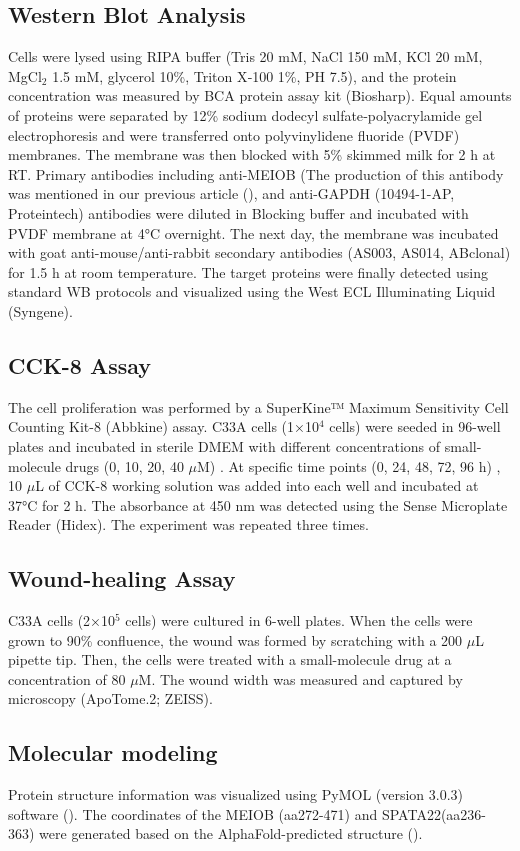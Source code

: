 \documentclass[unnumsec,webpdf,contemporary,large]{oup-authoring-template}%
\theoremstyle{thmstyleone}%
\theoremstyle{thmstyletwo}%
\theoremstyle{thmstylethree}%
\begin{document}
\subsection*{Western Blot Analysis}
Cells were lysed using RIPA buffer (Tris 20 mM, NaCl 150 mM, KCl 20 mM, MgCl$_2$ 1.5 mM, glycerol 10\%, Triton X‐100 1\%, PH 7.5), and the protein concentration was measured by BCA protein assay kit (Biosharp). Equal amounts of proteins were separated by 12\% sodium dodecyl sulfate‐polyacrylamide gel electrophoresis and were transferred onto polyvinylidene fluoride (PVDF) membranes. The membrane was then blocked with 5\% skimmed milk for 2 h at RT. Primary antibodies including anti-MEIOB (The production of this antibody was mentioned in our previous article (\citealt{6}), and anti-GAPDH (10494-1-AP, Proteintech) antibodies were diluted in Blocking buffer and incubated with PVDF membrane at 4°C overnight. The next day, the membrane was incubated with goat anti-mouse/anti-rabbit secondary antibodies (AS003, AS014, ABclonal) for 1.5 h at room temperature. The target proteins were finally detected using standard WB protocols and visualized using the West ECL Illuminating Liquid (Syngene). 

\subsection*{CCK-8 Assay}
The cell proliferation was performed by a SuperKine™ Maximum Sensitivity Cell Counting Kit-8 (Abbkine) assay. C33A cells (1×10$^{4}$ cells) were seeded in 96-well plates and incubated in sterile DMEM with different concentrations of small-molecule drugs (0, 10, 20, 40 $\mu$M) . At specific time points (0, 24, 48, 72, 96 h) , 10 $\mu$L of CCK-8 working solution was added into each well and incubated at 37°C for 2 h. The absorbance at 450 nm was detected using the Sense Microplate Reader (Hidex). The experiment was repeated three times.

\subsection*{Wound-healing Assay}
C33A cells (2×10$^{5}$ cells) were cultured in 6-well plates. When the cells were grown to 90\% confluence, the wound was formed by scratching with a 200 $\mu$L pipette tip. Then, the cells were treated with a small-molecule drug at a concentration of 80 $\mu$M. The wound width was measured and captured by microscopy (ApoTome.2; ZEISS).

\subsection*{Molecular modeling}
Protein structure information was visualized using PyMOL (version 3.0.3) software (\citealt{68}). The coordinates of the MEIOB (aa272-471) and SPATA22(aa236-363) were generated based on the AlphaFold-predicted structure (\citealt{69}).
\end{document}
